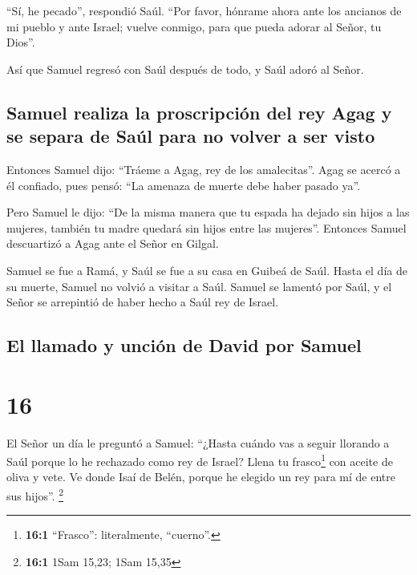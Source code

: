  ``Sí, he pecado'', respondió Saúl. ``Por favor, hónrame
ahora ante los ancianos de mi pueblo y ante Israel; vuelve conmigo, para
que pueda adorar al Señor, tu Dios''.

 Así que Samuel regresó con Saúl después de todo, y Saúl
adoró al Señor.

\hypertarget{samuel-realiza-la-proscripciuxf3n-del-rey-agag-y-se-separa-de-sauxfal-para-no-volver-a-ser-visto}{%
\subsection{Samuel realiza la proscripción del rey Agag y se separa de
Saúl para no volver a ser
visto}\label{samuel-realiza-la-proscripciuxf3n-del-rey-agag-y-se-separa-de-sauxfal-para-no-volver-a-ser-visto}}

 Entonces Samuel dijo: ``Tráeme a Agag, rey de los
amalecitas''. Agag se acercó a él confiado, pues pensó: ``La amenaza de
muerte debe haber pasado ya''.

 Pero Samuel le dijo: ``De la misma manera que tu espada
ha dejado sin hijos a las mujeres, también tu madre quedará sin hijos
entre las mujeres''. Entonces Samuel descuartizó a Agag ante el Señor en
Gilgal.

 Samuel se fue a Ramá, y Saúl se fue a su casa en Guibeá
de Saúl.  Hasta el día de su muerte, Samuel no volvió a
visitar a Saúl. Samuel se lamentó por Saúl, y el Señor se arrepintió de
haber hecho a Saúl rey de Israel.

\hypertarget{el-llamado-y-unciuxf3n-de-david-por-samuel}{%
\subsection{El llamado y unción de David por
Samuel}\label{el-llamado-y-unciuxf3n-de-david-por-samuel}}

\hypertarget{section-15}{%
\section{16}\label{section-15}}

 El Señor un día le preguntó a Samuel: ``¿Hasta cuándo vas
a seguir llorando a Saúl porque lo he rechazado como rey de Israel?
Llena tu frasco\footnote{\textbf{16:1} ``Frasco'': literalmente,
  ``cuerno''.} con aceite de oliva y vete. Ve donde Isaí de Belén,
porque he elegido un rey para mí de entre sus hijos''. \footnote{\textbf{16:1}
  1Sam 15,23; 1Sam 15,35}

